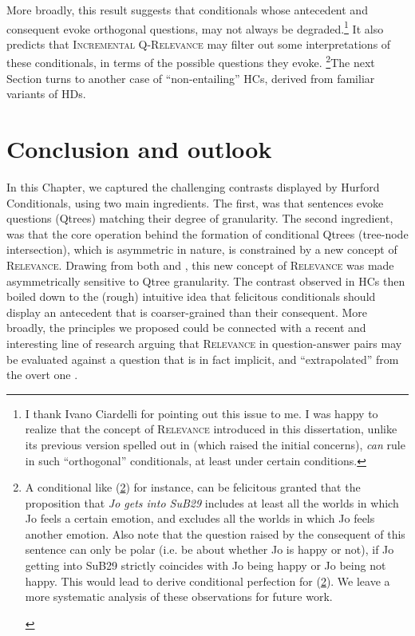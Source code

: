 More broadly, this result suggests that conditionals whose antecedent and consequent evoke orthogonal questions, may not always be degraded.\footnote{I thank Ivano Ciardelli for pointing out this issue to me. I was happy to realize that the concept of \textsc{Relevance} introduced in this dissertation, unlike its previous version spelled out in \textcite{HenotMortier2024a} (which raised the initial concerns), \textit{can} rule in such ``orthogonal'' conditionals, at least under certain conditions.} It also predicts that \textsc{Incremental Q-Relevance} may filter out some interpretations of these conditionals, in terms of the possible questions they evoke. \footnote{A conditional like (\ref{ex6:orthogonal-conditional}) for instance, can be felicitous granted that the proposition that \textit{Jo gets into SuB29} includes at least all the worlds in which Jo feels a certain emotion, and excludes all the worlds in which Jo feels another emotion. Also note that the question raised by the consequent of this sentence can only be polar (i.e. be about whether Jo is happy or not), if Jo getting into SuB29 strictly coincides with Jo being happy or Jo being not happy. This would lead to derive conditional perfection for (\ref{ex6:orthogonal-conditional}). We leave a more systematic analysis of these observations for future work.

\begin{exe}
	\label{ex6:orthogonal-conditional}
\end{exe}}The next Section turns to another case of ``non-entailing'' HCs, derived from familiar variants of HDs.



\section{Conclusion and outlook}\label{sec6:ccl}


In this Chapter, we captured the challenging contrasts displayed by Hurford Conditionals, using two main ingredients. The first, was that sentences evoke questions (Qtrees) matching their degree of granularity. The second ingredient, was that the core operation behind the formation of conditional Qtrees (tree-node intersection), which is asymmetric in nature, is constrained by a new concept of \textsc{Relevance}. Drawing from both \textcite{Lewis1988} and \textcite{Roberts2012}, this new concept of \textsc{Relevance} was made asymmetrically sensitive to Qtree granularity. The contrast observed in HCs then boiled down to the (rough) intuitive idea that felicitous conditionals should display an antecedent that is coarser-grained than their consequent. More broadly, the principles we proposed could be connected with a recent and interesting line of research arguing that \textsc{Relevance} in question-answer pairs may be evaluated against a question that is in fact implicit, and ``extrapolated'' from the overt one \parencite{Benbaji2024, Benbaji2025}.\\

